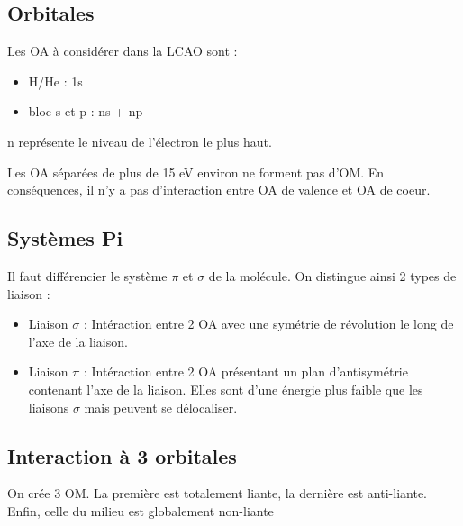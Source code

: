 \documentclass[french]{yLectureNote}
\begin{document}
\subsection{Orbitales}
Les OA à considérer dans la LCAO sont :
\begin{proposition}[OA à considérer]
\begin{itemize}
 \item H/He : 1s
 \item bloc s et p : ns + np
\end{itemize}
n représente le niveau de l'électron  le plus haut.
\end{proposition}
\begin{theorem}[Règle de 15 eV]
 Les OA séparées de plus de 15 eV environ ne forment pas d'OM. En conséquences, il n'y a pas d'interaction entre OA de valence et OA de coeur.
\end{theorem}
\subsection{Systèmes Pi}
Il faut différencier le système \(\pi\) et \(\sigma\) de la molécule.
On distingue ainsi 2 types de liaison :
\begin{itemize}
 \item Liaison $\sigma$ : Intéraction entre 2 OA avec une symétrie de révolution le long de l'axe de la liaison.
 \item Liaison $\pi$ : Intéraction entre 2 OA présentant un plan d'antisymétrie contenant l'axe de la liaison. Elles sont d'une énergie plus faible que les liaisons $\sigma$ mais peuvent se délocaliser.
\end{itemize}
\subsection{Interaction à 3 orbitales}
On crée 3 OM. La première est totalement liante, la dernière est anti-liante. Enfin, celle du milieu est globalement non-liante
\end{document}

